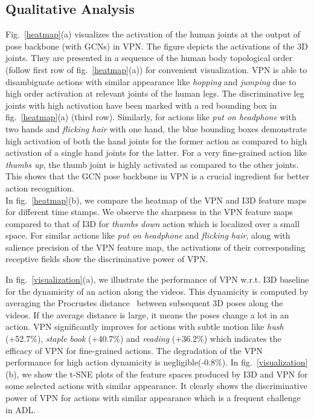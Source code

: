 \documentclass[runningheads]{llncs}
\begin{document}
\subsection{Qualitative Analysis}
Fig.~\ref{heatmap}(a) visualizes the activation of the human joints at the output of pose backbone (with GCNs) in VPN. The figure depicts the activations of the 3D joints. They are presented in a sequence of the human body topological order (follow first row of fig.~\ref{heatmap}(a)) for convenient visualization. VPN is able to disambiguate actions with similar appearance like \textit{hopping} and \textit{jumping} due to high order activation at relevant joints of the human legs. The discriminative leg joints with high activation have been marked with a red bounding box in fig.~\ref{heatmap}(a) (third row). Similarly, for actions like \textit{put on headphone} with two hands and \textit{flicking hair} with one hand, the blue bounding boxes demonstrate high activation of both the hand joints for the former action as compared to high activation of a single hand joints for the latter. For a very fine-grained action like \textit{thumbs up}, the thumb joint is highly activated as compared to the other joints. This shows that the GCN pose backbone in VPN is a crucial ingredient for better action recognition. \\
\noindent In fig.~\ref{heatmap}(b), we compare the heatmap of the VPN and I3D feature maps for different time stamps. We observe the sharpness in the VPN feature maps compared to that of I3D for \textit{thumbs down} action which is localized over a small space. For similar actions like \textit{put on headphone} and \textit{flicking hair}, along with salience precision of the VPN feature map, the activations of their corresponding receptive fields show the discriminative power of VPN.

\noindent In fig.~\ref{visualization}(a), we illustrate the performance of VPN w.r.t. I3D baseline for the dynamicity of an action along the videos. This dynamicity is computed by averaging the Procrustes distance~\cite{procustes} between subsequent 3D poses along the videos. If the average distance is large, it means the poses change a lot in an action. VPN significantly improves for actions with subtle motion like \textit{hush} (+52.7\%), \textit{staple book} (+40.7\%) and \textit{reading} (+36.2\%) which indicates the efficacy of VPN for fine-grained actions. The degradation of the VPN performance for high action dynamicity is negligible(-0.8\%).
 In fig.~\ref{visualization}(b), we show the t-SNE plots of the feature spaces produced by I3D and VPN for some selected actions with similar appearance. It clearly shows the discriminative power of VPN for actions with similar appearance which is a frequent challenge in ADL.
\end{document}
